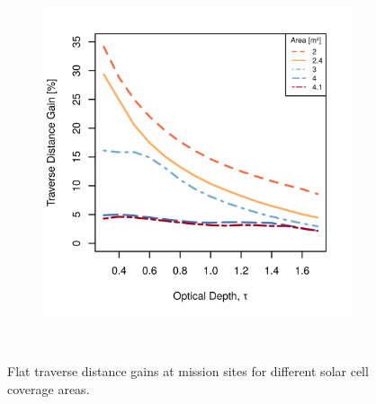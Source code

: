 \begin{figure}[h]
\begin{subfigure}[t]{\subfigureWidth}
        \includegraphics[height=\graphicsHeight]{sections/design/solar-array/plots/ismeniuscavus-75w-traverse-gains-for-different-solar-cell-coverage-areas.png}
		\label{fig:plot:sub:iani-chaos-flat-traverse-gains-for-different-sa-area}
	\end{subfigure}\\[0.8ex]
    \caption[Flat traverse distance gains at mission sites for different solar cell coverage areas]
            {Flat traverse distance gains at mission sites for different solar cell coverage areas.}
    \label{fig:plot:flat-traverse-gains-for-different-sa-area}
\vspace{-2ex}
\end{figure}


